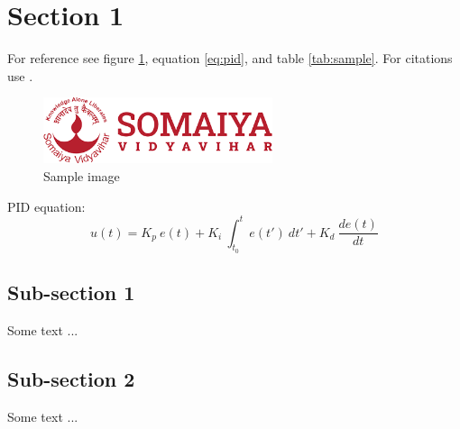 \vspace{-0.8cm}
\noindent{}

\section{Section 1}
For reference see figure \ref{fig:sample}, equation \ref{eq:pid}, and table \ref{tab:sample}. For citations use \cite{PID}.

\begin{figure}[hbt!]
    \centering
    \includegraphics[width=0.6\textwidth]{images/somaiya.png}
    \caption{Sample image}\label{fig:sample}
\end{figure}

PID equation:
\[u(t) = K_p \ e(t) + K_i\ \int_{t_0}^{t} e(t') \ dt' + K_d \ \frac{de(t)}{dt}\] \label{eq:pid}

\begin{table}[hbt!]
\begin{center}
\caption{\label{tab:sample}Sample table}
\end{center}
\end{table}

\subsection{Sub-section 1}
Some text ...

\subsection{Sub-section 2}
Some text ...